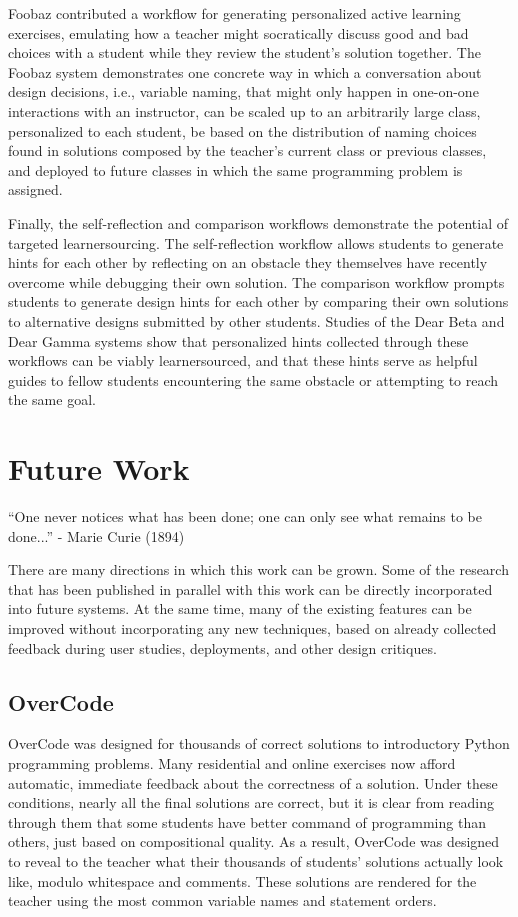 Foobaz contributed a workflow for generating personalized active learning exercises, emulating how a teacher might socratically discuss good and bad choices with a student while they review the student's solution together. The Foobaz system demonstrates one concrete way in which a conversation about design decisions, i.e., variable naming, that might only happen in one-on-one interactions with an instructor, can be scaled up to an arbitrarily large class, personalized to each student, be based on the distribution of naming choices found in solutions composed by the teacher's current class or previous classes, and deployed to future classes in which the same programming problem is assigned.

Finally, the self-reflection and comparison workflows demonstrate the potential of targeted learnersourcing. The self-reflection workflow allows students to generate hints for each other by reflecting on an obstacle they themselves have recently overcome while debugging their own solution. The comparison workflow prompts students to generate design hints for each other by comparing their own solutions to alternative designs submitted by other students. Studies of the Dear Beta and Dear Gamma systems show that personalized hints collected through these workflows can be viably learnersourced, and that these hints serve as helpful guides to fellow students encountering the same obstacle or attempting to reach the same goal.

\section{Future Work}
``One never notices what has been done; one can only see what remains to be done...'' - Marie Curie (1894)

There are many directions in which this work can be grown. Some of the research that has been published in parallel with this work can be directly incorporated into future systems. At the same time, many of the existing features can be improved without incorporating any new techniques, based on already collected feedback during user studies, deployments, and other design critiques.

\subsection{OverCode}

OverCode was designed for thousands of correct solutions to introductory Python programming problems. Many residential and online exercises now afford automatic, immediate feedback about the correctness of a solution. Under these conditions, nearly all the final solutions are correct, but it is clear from reading through them that some students have better command of programming than others, just based on compositional quality. As a result, OverCode was designed to reveal to the teacher what their thousands of students' solutions actually look like, modulo whitespace and comments. These solutions are rendered for the teacher using the most common variable names and statement orders.%

